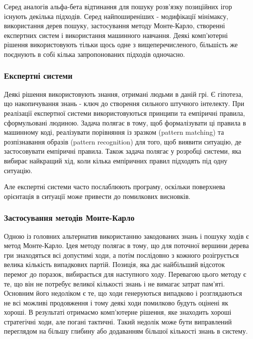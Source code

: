 \documentclass[12pt,a4paper]{article}
\begin{document}
Серед аналогів альфа-бета відтинання для пошуку розв'язку позиційних ігор
існують декілька підходів. Серед найпоширеніших - модифікації мінімаксу,
використання дерев пошуку, застосування методу Монте-Карло, створенні
експертних систем і використання машинного навчання. Деякі комп'ютерні рішення
використовують тільки щось одне з вищеперечисленого, більшість же поєднують в
собі кілька запропонованих підходів одночасно.

\subsubsection{Експертні системи}

Деякі рішення використовують знання, отримані людьми в даній грі. Є гіпотеза,
що накопичування знань - ключ до створення сильного штучного інтелекту. При
реалізації експертної системи використовуються принципи та емпіричні правила,
сформульовані людиною. Задача полягає в тому, щоб формалізувати ці правила в
машинному коді, реалізувати порівняння із зразком (pattern matching) та
розпізнавання образів (pattern recognition) для того, щоб виявити ситуацію, де
застосовувати емпіричні правила. Також задача полягає у розробці системи, яка
вибирає найкращий хід, коли кілька емпіричних правил підходять під одну
ситуацію.

Але експертні системи часто послаблюють програму, оскільки поверхнева
орієнтація в ситуації може привести до помилкових висновків.

\subsubsection{Застосування методів Монте-Карло}

Одною із головних альтернатив використанню закодованих знань і пошуку ходів є
метод Монте-Карло. Ідея методу полягає в тому, що для поточної вершини дерева
гри знаходяться всі допустимі ходи, а потім послідовно з кожного розігрується
велика кількість випадкових партій. Позиція, яка дає найбільший відсоток
перемог до поразок, вибирається для наступного ходу. Перевагою цього методу є
те, що він не потребує великої кількості знань і не вимагає затрат
пам'яті. Основним його недоліком є те, що ходи генеруються випадково і
розглядаються не всі можливі продовження і тому деякі ходи помилково будуть
оцінені як хороші. В результаті отримаємо комп'ютерне рішення, яке знаходить
хороші стратегічні ходи, але погані тактичні. Такий недолік може бути
виправлений переглядом на більшу глибину або додаванням більшої кількості
знань в систему.
\end{document}
